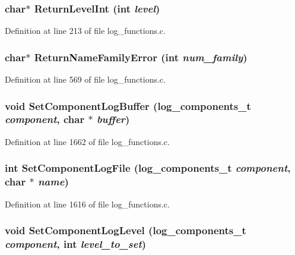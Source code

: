 \subsubsection[{ReturnLevelInt}]{\setlength{\rightskip}{0pt plus 5cm}char$\ast$ ReturnLevelInt (int {\em level})}\label{log__functions_8c_adebc36a127d9c0b3c32333a8a668f6d1}


Definition at line 213 of file log\_\-functions.c.
\subsubsection[{ReturnNameFamilyError}]{\setlength{\rightskip}{0pt plus 5cm}char$\ast$ ReturnNameFamilyError (int {\em num\_\-family})}\label{log__functions_8c_a2e330c217ed202523ad038ef05ed90dd}


Definition at line 569 of file log\_\-functions.c.
\subsubsection[{SetComponentLogBuffer}]{\setlength{\rightskip}{0pt plus 5cm}void SetComponentLogBuffer (log\_\-components\_\-t {\em component}, \/  char $\ast$ {\em buffer})}\label{log__functions_8c_a852aa49c2861c12ea43ab4f39b4d131c}


Definition at line 1662 of file log\_\-functions.c.
\subsubsection[{SetComponentLogFile}]{\setlength{\rightskip}{0pt plus 5cm}int SetComponentLogFile (log\_\-components\_\-t {\em component}, \/  char $\ast$ {\em name})}\label{log__functions_8c_a6662ca0e03715d34af31973a15f4b54e}


Definition at line 1616 of file log\_\-functions.c.
\subsubsection[{SetComponentLogLevel}]{\setlength{\rightskip}{0pt plus 5cm}void SetComponentLogLevel (log\_\-components\_\-t {\em component}, \/  int {\em level\_\-to\_\-set})}\label{log__functions_8c_adfdcef75cb06b8b3d1b9e9b4f9979f4d}


